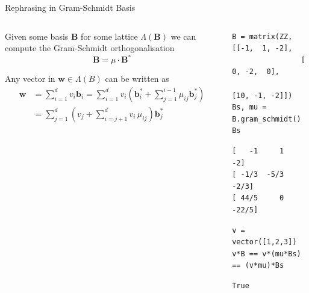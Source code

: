 \documentclass[presentation,smaller]{beamer}
\renewcommand{\vec}[1]{\mathbf{#1}\xspace}
\newcommand{\mat}[1]{\mathbf{#1}\xspace}
\begin{document}
\begin{frame}[fragile,label={sec:org2d5efe3}]{Rephrasing in Gram-Schmidt Basis}
 \begin{columns}[t]
\begin{column}{0.6\columnwidth}
Given some basis \(\mat{B}\) for some lattice \(Λ(\mat{B})\) we can compute the Gram-Schmidt orthogonalisation \[\mat{B} = μ \cdot \mat{B}^*\]

Any vector in \(\vec{w} \in Λ(B)\) can be written as 
\begin{align*}
\vec{w} &= \sum_{i=1}^d v_i \vec{b}_i = \sum_{i=1}^{d} v_i \left(\vec{b}_i^* + \sum_{j=1}^{i-1} \mu_{ij} \vec{b}_j^* \right)\\
        &= \sum_{j=1}^{d} \left(v_j  + \sum_{i=j+1}^{d} v_i\, \mu_{ij} \right) \vec{b}_j^* 
\end{align*}
\end{column}

\begin{column}{0.4\columnwidth}
\lstset{language=sage,label= ,caption= ,captionpos=b,numbers=none}
\begin{lstlisting}
B = matrix(ZZ, [[-1,  1, -2], 
                [ 0, -2,  0], 
                [10, -1, -2]])
Bs, mu = B.gram_schmidt()
Bs
\end{lstlisting}

\begin{verbatim}
[   -1     1    -2]
[ -1/3  -5/3  -2/3]
[ 44/5     0 -22/5]
\end{verbatim}


\lstset{language=sage,label= ,caption= ,captionpos=b,numbers=none}
\begin{lstlisting}
v = vector([1,2,3])
v*B == v*(mu*Bs) == (v*mu)*Bs
\end{lstlisting}

\begin{verbatim}
True
\end{verbatim}
\end{column}
\end{columns}
\end{frame}
\end{document}
